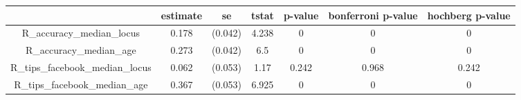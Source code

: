 \begin{tabular}{ccccccc}
  \hline
 & estimate & se & tstat & p-value & bonferroni p-value & hochberg p-value \\ 
  \hline
R\_accuracy\_median\_locus & 0.178 & (0.042) & 4.238 & 0 & 0 & 0 \\ 
  R\_accuracy\_median\_age & 0.273 & (0.042) & 6.5 & 0 & 0 & 0 \\ 
  R\_tips\_facebook\_median\_locus & 0.062 & (0.053) & 1.17 & 0.242 & 0.968 & 0.242 \\ 
  R\_tips\_facebook\_median\_age & 0.367 & (0.053) & 6.925 & 0 & 0 & 0 \\ 
   \hline
\end{tabular}
